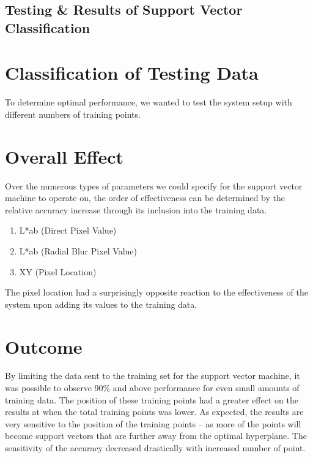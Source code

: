 \section {Testing \& Results of Support Vector Classification}

\chapter{Classification of Testing Data}
To determine optimal performance, we wanted to test the system setup with different numbers of training points.

\chapter{Overall Effect}

Over the numerous types of parameters we could specify for the support vector machine to operate on, the order of effectiveness can be determined by the relative accuracy increase through its inclusion into the training data.

\begin{enumerate}
  \item L*ab (Direct Pixel Value)
  \item L*ab (Radial Blur Pixel Value)
  \item XY (Pixel Location)
\end{enumerate}

The pixel location had a surprisingly opposite reaction to the effectiveness of the system upon adding its values to the training data.

\chapter{Outcome}

By limiting the data sent to the training set for the support vector machine, it was possible to observe 90\% and above performance for even small amounts of training data. The position of these training points had a greater effect on the results at when the total training points was lower. As expected, the results are very sensitive to the position of the training points -- as more of the points will become support vectors that are further away from the optimal hyperplane. The sensitivity of the accuracy decreased drastically with increased number of point.


